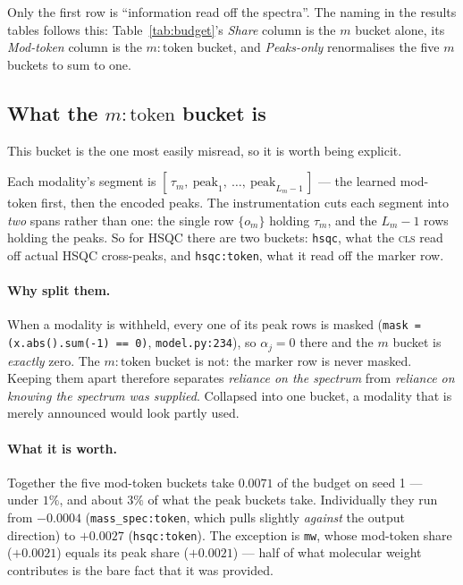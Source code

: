 \documentclass[11pt]{article}
\theoremstyle{plain}
\theoremstyle{remark}
\newcommand{\code}[1]{\texttt{\small #1}}
\begin{document}
\noindent
Only the first row is ``information read off the spectra''. The naming in the
results tables follows this: Table~\ref{tab:budget}'s \emph{Share} column is
the $m$ bucket alone, its \emph{Mod-token} column is the $m{:}\text{token}$
bucket, and \emph{Peaks-only} renormalises the five $m$ buckets to sum to one.

\subsection{What the \texorpdfstring{$m{:}\text{token}$}{m:token} bucket is}
\label{sec:modtoken}

This bucket is the one most easily misread, so it is worth being explicit.

Each modality's segment is $[\,\tau_m,\ \text{peak}_1,\ \dots,\
\text{peak}_{L_m-1}\,]$ --- the learned mod-token first, then the encoded
peaks. The instrumentation cuts each segment into \emph{two} spans rather than
one: the single row $\{o_m\}$ holding $\tau_m$, and the $L_m - 1$ rows holding
the peaks. So for HSQC there are two buckets: \code{hsqc}, what the \textsc{cls}
read off actual HSQC cross-peaks, and \code{hsqc:token}, what it read off the
marker row.

\paragraph{Why split them.} When a modality is withheld, every one of its peak
rows is masked (\code{mask = (x.abs().sum(-1) == 0)}, \code{model.py:234}), so
$\alpha_j = 0$ there and the $m$ bucket is \emph{exactly} zero. The
$m{:}\text{token}$ bucket is not: the marker row is never masked. Keeping them
apart therefore separates \emph{reliance on the spectrum} from \emph{reliance
on knowing the spectrum was supplied}. Collapsed into one bucket, a modality
that is merely announced would look partly used.

\paragraph{What it is worth.} Together the five mod-token buckets take
$0.0071$ of the budget on seed 1 --- under $1\%$, and about $3\%$ of what the
peak buckets take. Individually they run from $-0.0004$
(\code{mass\_spec:token}, which pulls slightly \emph{against} the output
direction) to $+0.0027$ (\code{hsqc:token}). The exception is \code{mw}, whose
mod-token share ($+0.0021$) equals its peak share ($+0.0021$) --- half of
what molecular weight contributes is the bare fact that it was provided.
\end{document}
